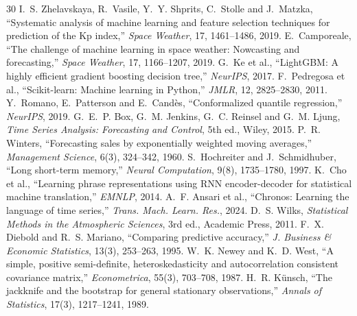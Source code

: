 \documentclass[11pt,a4paper]{article}
\begin{document}
{\begin{thebibliography}{30}
 I.~S. Zhelavskaya, R.~Vasile, Y.~Y. Shprits, C.~Stolle and J.~Matzka, ``Systematic analysis of machine learning and feature selection techniques for prediction of the Kp index,'' \emph{Space Weather}, 17, 1461--1486, 2019.
 E.~Camporeale, ``The challenge of machine learning in space weather: Nowcasting and forecasting,'' \emph{Space Weather}, 17, 1166--1207, 2019.
 G.~Ke et al., ``LightGBM: A highly efficient gradient boosting decision tree,'' \emph{NeurIPS}, 2017.
 F.~Pedregosa et al., ``Scikit-learn: Machine learning in Python,'' \emph{JMLR}, 12, 2825--2830, 2011.
 Y.~Romano, E.~Patterson and E.~Cand\`es, ``Conformalized quantile regression,'' \emph{NeurIPS}, 2019.
 G.~E.~P. Box, G.~M. Jenkins, G.~C. Reinsel and G.~M. Ljung, \emph{Time Series Analysis: Forecasting and Control}, 5th ed., Wiley, 2015.
 P.~R. Winters, ``Forecasting sales by exponentially weighted moving averages,'' \emph{Management Science}, 6(3), 324--342, 1960.
 S.~Hochreiter and J.~Schmidhuber, ``Long short-term memory,'' \emph{Neural Computation}, 9(8), 1735--1780, 1997.
 K.~Cho et al., ``Learning phrase representations using RNN encoder-decoder for statistical machine translation,'' \emph{EMNLP}, 2014.
 A.~F. Ansari et al., ``Chronos: Learning the language of time series,'' \emph{Trans. Mach. Learn. Res.}, 2024.
 D.~S. Wilks, \emph{Statistical Methods in the Atmospheric Sciences}, 3rd ed., Academic Press, 2011.
 F.~X. Diebold and R.~S. Mariano, ``Comparing predictive accuracy,'' \emph{J. Business \& Economic Statistics}, 13(3), 253--263, 1995.
 W.~K. Newey and K.~D. West, ``A simple, positive semi-definite, heteroskedasticity and autocorrelation consistent covariance matrix,'' \emph{Econometrica}, 55(3), 703--708, 1987.
 H.~R. K\"unsch, ``The jackknife and the bootstrap for general stationary observations,'' \emph{Annals of Statistics}, 17(3), 1217--1241, 1989.
\end{thebibliography}}
\end{document}
